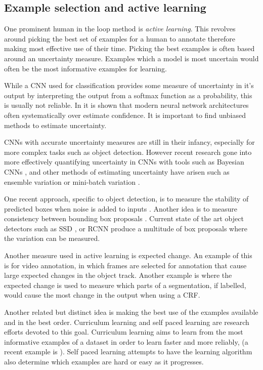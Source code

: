 \subsection{Example selection and active learning} 

One prominent human in the loop method is \emph{active learning}. This revolves around picking the best set of examples for a human to annotate therefore making most effective use of their time. Picking the best examples is often based around an uncertainty measure. Examples which a model is most uncertain would often be the most informative examples for learning. 
 
While a \gls{CNN} used for classification provides some measure of uncertainty in it's output by interpreting the output from a softmax function as a probability, this is usually not reliable. In \cite{Guo2017} it is shown that modern neural network architectures often systematically over estimate confidence. It is important to find unbiased methods to estimate uncertainty.

\gls{CNN}s with accurate uncertainty measures are still  in their infancy, especially for more complex tasks such as object detection. However recent research gone into more effectively quantifying uncertainty in \gls{CNN}s with tools such as Bayesian \gls{CNN}s \cite{Gal2017}, and other methods of estimating uncertainty have arisen such as ensemble variation \cite{Beluch2018} or mini-batch variation \cite{Chang2017}. 

 One recent approach, specific to object detection, is to measure the stability of predicted boxes when noise is added to inputs \cite{Kao2018}. Another idea is to measure consistency between bounding box proposals \cite{Kao2018, Brust2018, Le2018}. Current state of the art object detectors such as \gls{SSD} \cite{Liu2016a}, or \gls{RCNN} \cite{Wang2017} produce a multitude of box proposals where the variation can be measured.

Another measure used in active learning is expected change. An example of this is \cite{Vondrick2011} for video annotation, in which frames are selected for annotation that cause large expected changes in the object track. Another example is \cite{Xu2017} where the expected change is used to measure which parts of a segmentation, if labelled, would cause the most change in the output when using a \gls{CRF}.

Another related but distinct idea is making the best use of the examples available and in the best order. Curriculum learning and self paced learning \cite{Kumar2010} are research efforts devoted to this goal. Curriculum learning aims to learn from the most informative examples of a dataset in order to learn faster and more reliably, (a recent example is \cite{Katharopoulos2018}). Self paced learning attempts to have the learning algorithm also determine which examples are hard or easy as it progresses.


